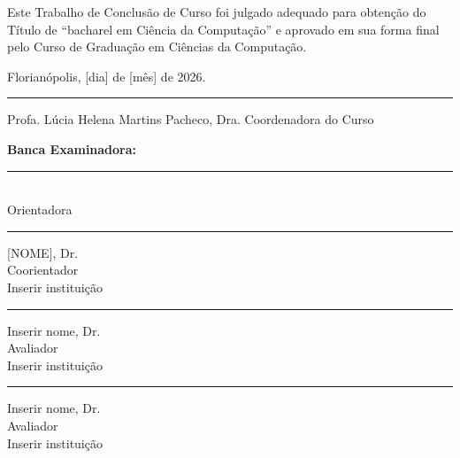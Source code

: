 \documentclass[
  12pt,        %
  oneside,      %
  a4paper,      %
  chapter=TITLE,    %
  section=TITLE,    %
  brazil,       %
  english,      %
]{abntex2}
\theoremstyle{definition}
\begin{document}
\begin{folhadeaprovacao}
  \fontsize{12}{1.5}
  \begin{center}
    {\ABNTEXchapterfont\imprimirautor}

    \vfill

    \begin{center}
      {\ABNTEXchapterfont\bfseries\MakeUppercase{\imprimirtitulo}}
    \end{center}

    \vfill

    Este Trabalho de Conclusão de Curso foi julgado adequado para obtenção do Título de “bacharel em Ciência da Computação” e aprovado em sua forma final pelo Curso de Graduação em Ciências da Computação.

    \vspace{1.5\onelineskip}

    Florianópolis, [dia] de [mês] de 2026.

    \vfill

    \rule{6cm}{1pt}

    Profa. Lúcia Helena Martins Pacheco, Dra.
    Coordenadora do Curso

    \vfill

    \textbf{Banca Examinadora:}

    \vfill

    \rule{6cm}{1pt}

    \imprimirorientador\\
    Orientadora

    \vspace{1.5\onelineskip}

    \rule{6cm}{1pt}

    [NOME], Dr.\\
    Coorientador\\
    Inserir instituição

    \vspace{1.5\onelineskip}
    \rule{6cm}{1pt}

    Inserir nome, Dr.\\
    Avaliador \\
    Inserir instituição

    \vspace{1.5\onelineskip}
    \rule{6cm}{1pt}

    Inserir nome, Dr.\\
    Avaliador \\
    Inserir instituição

  \end{center}
\end{folhadeaprovacao}
\end{document}
